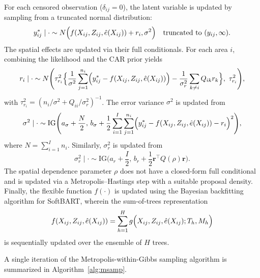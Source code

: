 \documentclass[useAMS,referee]{biom}
\begin{document}
For each censored observation ($\delta_{ij}=0$), the latent variable is updated by sampling from a truncated normal distribution:
\begin{equation} \label{eq:latent}
y_{ij}^\ast\mid \cdot \sim N\Bigl(f(X_{ij},Z_{ij},\hat{e}(X_{ij}))+r_i,\sigma^2\Bigr) \quad \text{truncated to } (y_{ij},\infty).
\end{equation}
The spatial effects are updated via their full conditionals. For each area $i$, combining the likelihood and the CAR prior yields
\begin{equation} \label{eq:rfull}
r_i\mid \cdot \sim N\Biggl(\tau_{r_i}^2\Bigl\{\frac{1}{\sigma^2}\sum_{j=1}^{n_i}\Bigl(y_{ij}^\ast-f(X_{ij},Z_{ij},\hat{e}(X_{ij}))\Bigr) -\frac{1}{\sigma_r^2}\sum_{k\neq i}Q_{ik}r_k\Bigr\},\ \tau_{r_i}^2\Biggr),
\end{equation}
with $\tau_{r_i}^2=(n_i/\sigma^2+Q_{ii}/\sigma_r^2)^{-1}$. The error variance $\sigma^2$ is updated from
\begin{equation} \label{eq:sigma2full}
\sigma^2\mid \cdot \sim \mathrm{IG}\Biggl(a_\sigma+\frac{N}{2},\, b_\sigma+\frac{1}{2}\sum_{i=1}^{I}\sum_{j=1}^{n_i}\Bigl(y_{ij}^\ast-f(X_{ij},Z_{ij},\hat{e}(X_{ij}))-r_i\Bigr)^2\Biggr),
\end{equation}
where $N=\sum_{i=1}^I n_i$. Similarly, $\sigma_r^2$ is updated from
\begin{equation} \label{eq:sigmar2full}
\sigma_r^2\mid \cdot \sim \mathrm{IG}\Biggl(a_r+\frac{I}{2},\, b_r+\frac{1}{2}\bm{r}^\top Q(\rho)\bm{r}\Biggr).
\end{equation}
The spatial dependence parameter $\rho$ does not have a closed-form full conditional and is updated via a Metropolis--Hastings step with a suitable proposal density. Finally, the flexible function $f(\cdot)$ is updated using the Bayesian backfitting algorithm for SoftBART, wherein the sum-of-trees representation
\[
f(X_{ij},Z_{ij},\hat{e}(X_{ij})) = \sum_{h=1}^H g\Bigl(X_{ij},Z_{ij},\hat{e}(X_{ij});T_h,M_h\Bigr)
\]
is sequentially updated over the ensemble of $H$ trees.

A single iteration of the Metropolis-within-Gibbs sampling algorithm is summarized in Algorithm~\ref{alg:msamp}.
\end{document}
